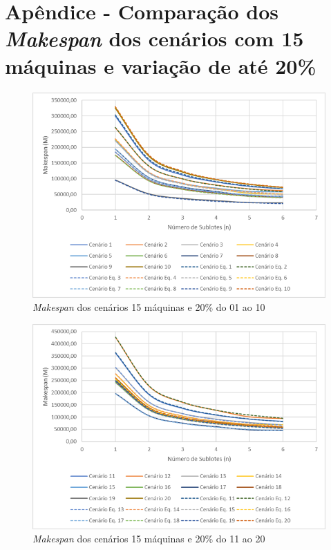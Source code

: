 \newpage
\section{Apêndice - Comparação dos \textit{Makespan} dos cenários com 15 máquinas e variação de até 20\%}\label{app:fig15machine20}

\begin{figure}[H]
    \centering
     \includegraphics[width=13cm]{Apendices/Figuras/15m20_01-10.png}
     \caption{\textit{Makespan} dos cenários 15 máquinas e 20\% do 01 ao 10}
    \label{fig:15m20_01-10}
\end{figure}

\begin{figure}[H]
    \centering
     \includegraphics[width=13cm]{Apendices/Figuras/15m20_11-20.png}
     \caption{\textit{Makespan} dos cenários 15 máquinas e 20\% do 11 ao 20}
    \label{fig:15m20_11-20}
\end{figure}

